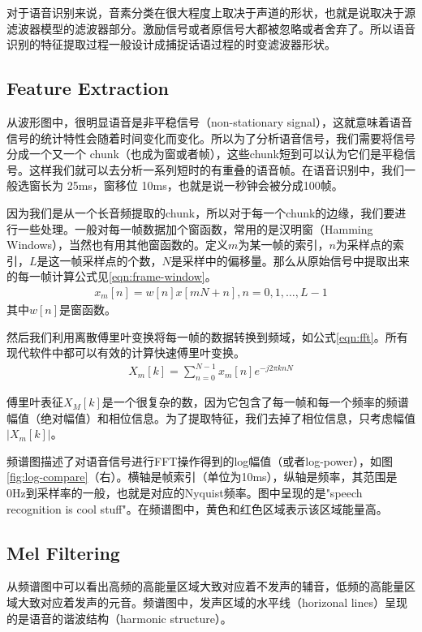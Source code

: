 对于语音识别来说，音素分类在很大程度上取决于声道的形状，也就是说取决于源滤波器模型的滤波器部分。激励信号或者原信号大都被忽略或者舍弃了。所以语音识别的特征提取过程一般设计成捕捉话语过程的时变滤波器形状。

\subsection{Feature Extraction} %
\label{sub:feature_extraction}
从波形图中，很明显语音是非平稳信号（non-stationary signal），这就意味着语音信号的统计特性会随着时间变化而变化。所以为了分析语音信号，我们需要将信号分成一个又一个 chunk（也成为窗或者帧），这些chunk短到可以认为它们是平稳信号。这样我们就可以去分析一系列短时的有重叠的语音帧。在语音识别中，我们一般选窗长为 25ms，窗移位 10ms，也就是说一秒钟会被分成100帧。

因为我们是从一个长音频提取的chunk，所以对于每一个chunk的边缘，我们要进行一些处理。一般对每一帧数据加个窗函数，常用的是汉明窗（Hamming Windows），当然也有用其他窗函数的。定义$m$为某一帧的索引，$n$为采样点的索引，$L$是这一帧采样点的个数，$N$是采样中的偏移量。那么从原始信号中提取出来的每一帧计算公式见\ref{eqn:frame-window}。
\begin{align}
\label{eqn:frame-window}
  x_{m}[n]=w[n] x[m N+n], n=0,1, \ldots, L-1
\end{align}
其中$w[n]$是窗函数。

然后我们利用离散傅里叶变换将每一帧的数据转换到频域，如公式\ref{eqn:fft}。所有现代软件中都可以有效的计算快速傅里叶变换。
\begin{align}
\label{eqn:fft}
  X_{m}[k]=\sum_{n=0}^{N-1} x_{m}[n] e^{-j 2 \pi k n N}
\end{align}

傅里叶表征$X_{M} [k]$是一个很复杂的数，因为它包含了每一帧和每一个频率的频谱幅值（绝对幅值）和相位信息。为了提取特征，我们去掉了相位信息，只考虑幅值 $|X_{m}[k]|$。

频谱图描述了对语音信号进行FFT操作得到的log幅值（或者log-power），如图\ref{fig:log-compare}（右）。横轴是帧索引（单位为10ms），纵轴是频率，其范围是0Hz到采样率的一般，也就是对应的Nyquist频率。图中呈现的是"speech recognition is cool stuff"。在频谱图中，黄色和红色区域表示该区域能量高。

\subsection{Mel Filtering} %
\label{sub:mel_filtering}
从频谱图中可以看出高频的高能量区域大致对应着不发声的辅音，低频的高能量区域大致对应着发声的元音。频谱图中，发声区域的水平线（horizonal lines）呈现的是语音的谐波结构（harmonic structure）。

